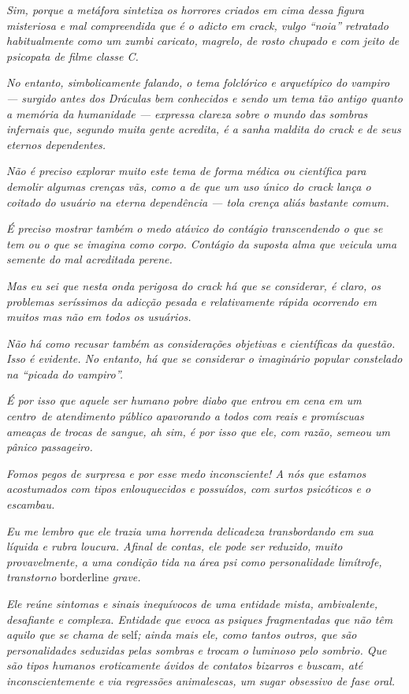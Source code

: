 \emph{Sim, porque a metáfora sintetiza os horrores criados em cima dessa
figura misteriosa e mal compreendida que é o adicto em crack, vulgo
``noia'' retratado habitualmente como um zumbi caricato, magrelo, de
rosto chupado e com jeito de psicopata de filme classe C.}~

\emph{No entanto, simbolicamente falando, o tema folclórico e
arquetípico do vampiro --- surgido antes dos Dráculas bem conhecidos e
sendo um tema tão antigo quanto a memória da humanidade --- expressa
clareza sobre o mundo das sombras infernais que, segundo muita gente
acredita, é a sanha maldita do crack e de seus eternos dependentes.}~

\emph{Não é preciso explorar muito este tema de forma médica ou
científica para demolir algumas crenças vãs, como a de que um uso único
do crack lança o coitado do usuário na eterna dependência --- tola crença
aliás bastante comum.}~

\emph{É preciso mostrar também o medo atávico do contágio transcendendo
o que se tem ou o que se imagina como corpo. Contágio da suposta alma que veicula uma semente do mal acreditada perene.}~

\emph{Mas eu sei que nesta onda perigosa do crack há que se considerar,
é claro, os problemas seríssimos da adicção pesada e relativamente
rápida ocorrendo em muitos mas não em todos os usuários.}~

\emph{Não há como recusar também as considerações objetivas e
científicas da questão. Isso é evidente. No entanto, há que se
considerar o imaginário popular constelado na ``picada do vampiro''.}~

\emph{É por isso que aquele ser humano pobre diabo que entrou em cena em
um centro~de atendimento público apavorando a todos com reais e
promíscuas ameaças de trocas de sangue, ah sim, é por isso que ele, com
razão, semeou um pânico passageiro.}~

\emph{Fomos pegos de surpresa e por esse medo inconsciente! A nós que
estamos acostumados com tipos enlouquecidos e possuídos, com surtos
psicóticos e o escambau.}~

\emph{Eu me lembro que ele trazia uma horrenda delicadeza transbordando
em sua líquida e rubra loucura. Afinal de contas, ele pode ser reduzido,
muito provavelmente, a uma condição tida na área psi como personalidade
limítrofe, transtorno} borderline \emph{grave.}~

\emph{Ele reúne sintomas e sinais inequívocos de uma entidade mista,
ambivalente, desafiante e complexa. Entidade que evoca as psiques
fragmentadas que não têm aquilo que se chama de} self\emph{; ainda mais ele,
como tantos outros, que são personalidades seduzidas pelas sombras e
trocam o luminoso pelo sombrio. Que são tipos humanos eroticamente
ávidos de contatos bizarros e buscam, até inconscientemente e via
regressões animalescas, um sugar obsessivo de fase oral.}~

